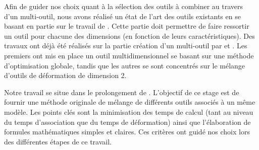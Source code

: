 Afin de guider nos choix quant à la sélection des outils à combiner au travers
d'un multi-outil, nous avons réalisé un état de l'art des outils existants en
se basant en partie sur le travail de \cite{GB08}. Cette partie doit permettre
de faire ressortir un outil pour chacune des dimensions (en fonction de leurs
caractéristiques). Des travaux ont déjà été réalisés sur la partie création
d'un multi-outil par \cite{JBPS11} et \cite{GPCP13}. Les premiers ont mis en
place un outil multidimensionnel se basant sur une méthode d'optimisation
globale, tandis que les autres se sont concentrés sur le mélange d'outils de
déformation de dimension 2. 

Notre travail se situe dans le prolongement de \cite{GPCP13}. L'objectif de ce
stage est de fournir une méthode originale de mélange de différents outils
associés à un même modèle. Les points clés sont la minimisation des temps de
calcul (tant au niveau du temps d'association que du temps de déformation)
ainsi que l'élaboration de formules mathématiques simples et claires. Ces
critères ont guidé nos choix lors des différentes étapes de ce travail.
